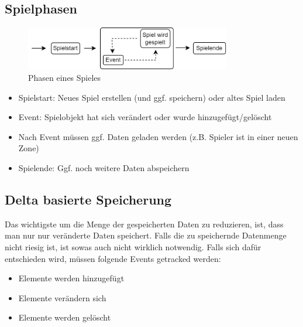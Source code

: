 \subsection{Spielphasen}
\begin{figure}[htp]
    \centering
    \includegraphics[width=0.8\textwidth]{images/Spielphasen.png}
    \caption{Phasen eines Spieles}
    \label{fig:spielphasen}
\end{figure}

\begin{itemize}
    \item Spielstart: Neues Spiel erstellen (und ggf. speichern) oder altes Spiel laden
    \item Event: Spielobjekt hat sich verändert oder wurde hinzugefügt/gelöscht
    \item Nach Event müssen ggf. Daten geladen werden (z.B. Spieler ist in einer neuen Zone)
    \item Spielende: Ggf. noch weitere Daten abspeichern
\end{itemize}



\subsection{Delta basierte Speicherung}
Das wichtigste um die Menge der gespeicherten Daten zu reduzieren, ist, dass man nur nur veränderte Daten speichert. Falls die zu speichernde Datenmenge nicht riesig ist, ist sowas auch nicht wirklich notwendig. Falls sich dafür entschieden wird, müssen folgende Events getracked werden:
\begin{itemize}
    \item Elemente werden hinzugefügt
    \item Elemente verändern sich
    \item Elemente werden gelöscht
\end{itemize}



